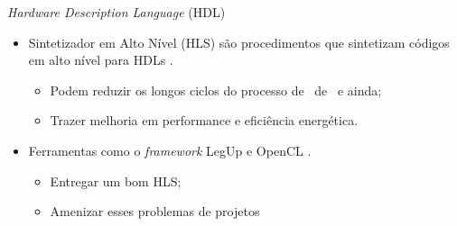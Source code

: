    \begin{frame}{\textit{Hardware Description Language} (HDL)} \vspace{-1em}
      \begin{itemize}
         \setlength{\itemsep}{1.7em}
         \item Sintetizador em Alto Nível (HLS) são procedimentos que sintetizam códigos em alto nível para HDLs \cite{Choi2016}.
         \begin{itemize}
            \setlength{\itemsep}{1.2em}
            \item Podem reduzir os longos ciclos do processo de \design\ de \hardware\ e ainda;
            \item Trazer melhoria em performance e eficiência energética.
         \end{itemize}
         
         \item Ferramentas como o \textit{framework} LegUp e OpenCL \cite{Trevett2008}.
         \begin{itemize}
            \setlength{\itemsep}{1.2em}
            \item Entregar um bom HLS;
            \item Amenizar esses problemas de projetos
         \end{itemize} 
      \end{itemize}
   \end{frame}



